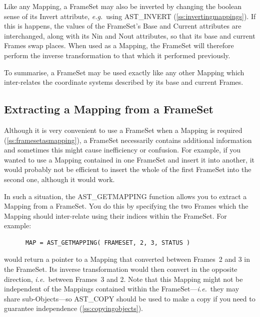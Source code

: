 \documentclass[twoside,11pt]{article}
\newcommand{\htmlref}[2]{#1}
\newcommand{\secref}[1]{\S\ref{#1}}
\renewcommand{\secref}[1]{\ref{#1}}
\begin{document}
Like any Mapping, a FrameSet may also be inverted by changing the
boolean sense of its \htmlref{Invert}{Invert} attribute, {\em{e.g.}}\ using \htmlref{AST\_INVERT}{AST_INVERT}
(\secref{ss:invertingmappings}). If this is happens, the values of the
FrameSet's \htmlref{Base}{Base} and \htmlref{Current}{Current} attributes are interchanged, along with
its Nin and Nout attributes, so that its base and current Frames swap
places. When used as a Mapping, the FrameSet will therefore perform
the inverse transformation to that which it performed previously.

To summarise, a FrameSet may be used exactly like any other Mapping
which inter-relates the coordinate systems described by its base and
current Frames.

\subsection{\label{ss:extractingamapping}Extracting a Mapping from a FrameSet}

Although it is very convenient to use a \htmlref{FrameSet}{FrameSet} when a \htmlref{Mapping}{Mapping} is
required (\secref{ss:framesetasmapping}), a FrameSet necessarily
contains additional information and sometimes this might cause
inefficiency or confusion.  For example, if you wanted to use a
Mapping contained in one FrameSet and insert it into another, it would
probably not be efficient to insert the whole of the first FrameSet
into the second one, although it would work.

In such a situation, the \htmlref{AST\_GETMAPPING}{AST_GETMAPPING} function allows you to
extract a Mapping from a FrameSet. You do this by specifying the two
Frames which the Mapping should inter-relate using their indices
within the FrameSet. For example:

\small
\begin{verbatim}
      MAP = AST_GETMAPPING( FRAMESET, 2, 3, STATUS )
\end{verbatim}
\normalsize

would return a pointer to a Mapping that converted between Frames~2
and 3 in the FrameSet. Its inverse transformation would then convert
in the opposite direction, {\em{i.e.}}\ between Frames~3 and 2.  Note
that this Mapping might not be independent of the Mappings contained
within the FrameSet---{\em{i.e.}}\ they may share sub-Objects---so
\htmlref{AST\_COPY}{AST_COPY} should be used to make a copy if you need to guarantee
independence (\secref{ss:copyingobjects}).
\end{document}
